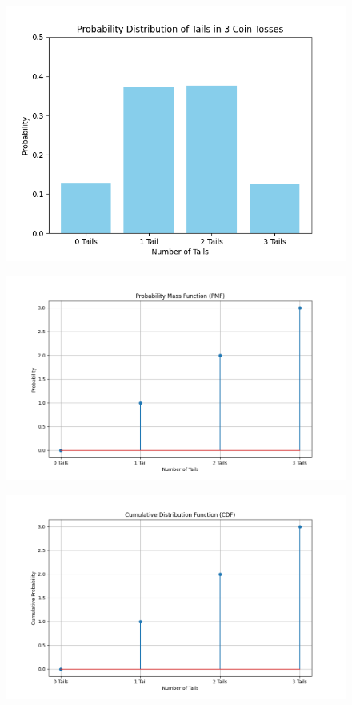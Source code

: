\documentclass[journal]{IEEEtran}
\begin{document}
\begin{figure}[h!]
   \centering
   \includegraphics[width=\columnwidth]{figs/fig1.png}
   \end{figure}
\begin{figure}[h!]
   \centering
   \includegraphics[width=\columnwidth]{figs/fig2.png}
   \end{figure}
\begin{figure}[h!]
   \centering
   \includegraphics[width=\columnwidth]{figs/fig3.png}
   \end{figure}
\end{document}
